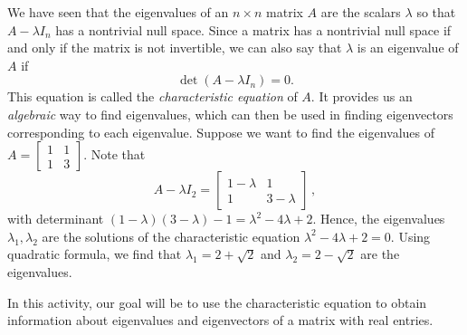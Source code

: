 \label{sec:chareq_intro}
We have seen that the eigenvalues of an $n \times n$ matrix $A$ are the scalars $\lambda$ so that $A - \lambda I_n$ has a nontrivial null space. Since a matrix has a nontrivial null space if and only if the matrix is not invertible, we can also say that $\lambda$ is an eigenvalue of $A$ if
\begin{equation}
\det(A - \lambda I_n) = 0. \label{eq:PA5.2_1}
\end{equation}
This equation is called the \emph{characteristic equation} of $A$. It provides us an \emph{algebraic} way to find eigenvalues, which can then be used in finding eigenvectors corresponding to each eigenvalue. Suppose we want to find the eigenvalues of $A=\left[ \begin{array}{cc} 1 & 1 \\ 1& 3 \end{array} \right]$. Note that 
\[ A- \lambda I_2 = \left[ \begin{array}{cc} 1-\lambda & 1 \\ 1& 3-\lambda \end{array} \right]\, ,\]
with determinant $(1-\lambda)(3-\lambda)-1=\lambda^2-4\lambda+2$. Hence, the eigenvalues $\lambda_1, \lambda_2$ are the solutions of the characteristic equation $\lambda^2-4\lambda+2=0$. Using quadratic formula, we find that $\lambda_1=2+\sqrt{2}$ and $\lambda_2=2-\sqrt{2}$ are the eigenvalues.

In this activity, our goal will be to use the characteristic equation to obtain information about eigenvalues and eigenvectors of a matrix with real entries.

